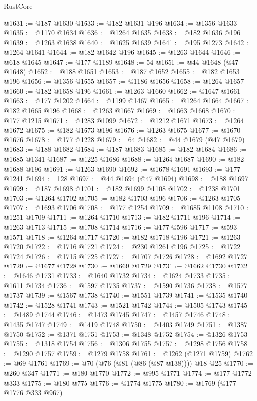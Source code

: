 \begin{lexlean}{RustCore}
\begin{coremodule}
@1631 := @187 @1630
@1633 := @182 @1631 @196
@1634 := @1356 @1633
@1635 := @1170 @1634
@1636 := @1264 @1635
@1638 := @182 @1636 @196
@1639 := @1263 @1638
@1640 := @1625 @1639
@1641 := @195 @1273
@1642 := @1264 @1641
@1644 := @182 @1642 @196
@1645 := @1263 @1644
@1646 := @618 @1645
@1647 := @177 @1189
@1648 := 54
@1651 := @44 @1648 (@47 @1648)
@1652 := @188 @1651
@1653 := @187 @1652
@1655 := @182 @1653 @196
@1656 := @1356 @1655
@1657 := @1186 @1656
@1658 := @1264 @1657
@1660 := @182 @1658 @196
@1661 := @1263 @1660
@1662 := @1647 @1661
@1663 := @177 @1202
@1664 := @1199 @1467
@1665 := @1264 @1664
@1667 := @182 @1665 @196
@1668 := @1263 @1667
@1669 := @1663 @1668
@1670 := @177 @1215
@1671 := @1283 @1099
@1672 := @1212 @1671
@1673 := @1264 @1672
@1675 := @182 @1673 @196
@1676 := @1263 @1675
@1677 := @1670 @1676
@1678 := @177 @1228
@1679 := 64
@1682 := @44 @1679 (@47 @1679)
@1683 := @188 @1682
@1684 := @187 @1683
@1685 := @182 @1684
@1686 := @1685 @1341
@1687 := @1225 @1686
@1688 := @1264 @1687
@1690 := @182 @1688 @196
@1691 := @1263 @1690
@1692 := @1678 @1691
@1693 := @177 @1241
@1694 := 128
@1697 := @44 @1694 (@47 @1694)
@1698 := @188 @1697
@1699 := @187 @1698
@1701 := @182 @1699 @1108
@1702 := @1238 @1701
@1703 := @1264 @1702
@1705 := @182 @1703 @196
@1706 := @1263 @1705
@1707 := @1693 @1706
@1708 := @177 @1254
@1709 := @1685 @1108
@1710 := @1251 @1709
@1711 := @1264 @1710
@1713 := @182 @1711 @196
@1714 := @1263 @1713
@1715 := @1708 @1714
@1716 := @177 @596
@1717 := @593 @1571
@1718 := @1264 @1717
@1720 := @182 @1718 @196
@1721 := @1263 @1720
@1722 := @1716 @1721
@1724 := @230 @1261 @196
@1725 := @1722 @1724
@1726 := @1715 @1725
@1727 := @1707 @1726
@1728 := @1692 @1727
@1729 := @1677 @1728
@1730 := @1669 @1729
@1731 := @1662 @1730
@1732 := @1646 @1731
@1733 := @1640 @1732
@1734 := @1624 @1733
@1735 := @1611 @1734
@1736 := @1597 @1735
@1737 := @1590 @1736
@1738 := @1577 @1737
@1739 := @1567 @1738
@1740 := @1551 @1739
@1741 := @1535 @1740
@1742 := @1528 @1741
@1743 := @1521 @1742
@1744 := @1505 @1743
@1745 := @1489 @1744
@1746 := @1473 @1745
@1747 := @1457 @1746
@1748 := @1435 @1747
@1749 := @1419 @1748
@1750 := @1403 @1749
@1751 := @1387 @1750
@1752 := @1371 @1751
@1753 := @1348 @1752
@1754 := @1326 @1753
@1755 := @1318 @1754
@1756 := @1306 @1755
@1757 := @1298 @1756
@1758 := @1290 @1757
@1759 := @1279 @1758
@1761 := @1262 (@1271 @1759)
@1762 := @69 @1761
@1769 := @70 (@76 (@81 (@86 (@87 @138)))) @18 @25
@1770 := @260 @347
@1771 := @180 @1770
@1772 := @995 @1771
@1774 := @177 @1772 @333
@1775 := @180 @775
@1776 := @1774 @1775
@1780 := @1769 (@177 @1776 @333 @967)

\end{coremodule}
\end{lexlean}
